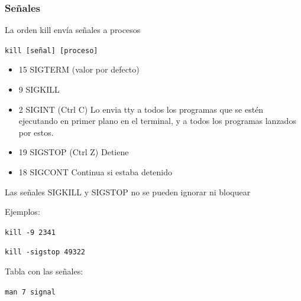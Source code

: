 \documentclass[ucs]{beamer}
\begin{document}


\begin{frame}[fragile]
\frametitle{Señales}
La orden kill envía señales a procesos

\verb|kill [señal] [proceso]|
\begin{itemize}
\item
15 SIGTERM (valor por defecto) 
\item
9  SIGKILL  
\item
2  SIGINT (Ctrl C) Lo envia tty a todos los programas que se estén ejecutando
en primer plano en el terminal, y a todos los programas lanzados por estos.
\item
19  SIGSTOP (Ctrl Z) Detiene
\item
18 SIGCONT Continua si estaba detenido

\end{itemize}

Las señales SIGKILL y SIGSTOP no se pueden ignorar ni bloquear

\end{frame}

\begin{frame}[fragile]

Ejemplos:
      
\verb|kill -9 2341|

\verb|kill -sigstop 49322|

Tabla con las señales: 

\verb|man 7 signal|
\end{frame}





%
%
\end{document}
